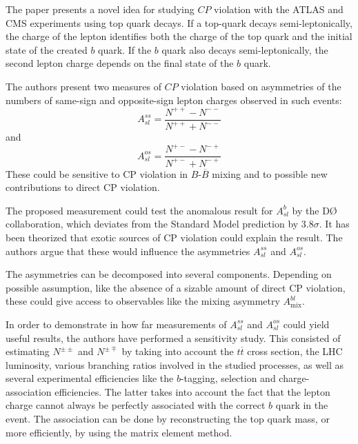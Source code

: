 

\noindent
The paper\cite{paper} presents a novel idea for studying $C\!P$ violation with the ATLAS and CMS experiments using top quark decays.
If a top-quark decays semi-leptonically, the charge of the lepton identifies both the charge of the top quark and the initial state of the created $b$ quark.
If the $b$ quark also decays semi-leptonically, the second lepton charge depends on the final state of the $b$ quark.

The authors present two measures of $C\!P$ violation based on asymmetries of the numbers of same-sign and opposite-sign lepton charges observed in such events:
\begin{equation}
  A^{ss}_{sl} = \frac{N^{++} - N^{--}}{N^{++} + N^{--}}
\end{equation}
and
\begin{equation}
  A^{os}_{sl} = \frac{N^{+-} - N^{-+}}{N^{+-} + N^{-+}}
\end{equation}
These could be sensitive to CP violation in $B$-$\overline{B}$ mixing and to possible new contributions to direct CP violation.

The proposed measurement could test the anomalous result for $A^b_{sl}$ by the DØ collaboration, which deviates from the Standard Model prediction by $3.8σ$.
It has been theorized that exotic sources of CP violation could explain the result.
The authors argue that these would influence the asymmetries $A^{ss}_{sl}$ and $A^{os}_{sl}$.

The asymmetries can be decomposed into several components.
Depending on possible assumption, like the absence of a sizable amount of direct CP violation, these could give access to observables like the mixing asymmetry $A^{bl}_\text{mix}$.

In order to demonstrate in how far measurements of $A^{ss}_{sl}$ and $A^{os}_{sl}$ could yield useful results, the authors have performed a sensitivity study.
This consisted of estimating $N^{\pm\pm}$ and $N^{\pm\mp}$ by taking into account the $t\overline{t}$ cross section, the LHC luminosity, various branching ratios involved in the studied processes, as well as several experimental efficiencies like the $b$-tagging, selection and charge-association efficiencies.
The latter takes into account the fact that the lepton charge cannot always be perfectly associated with the correct $b$ quark in the event.
The association can be done by reconstructing the top quark mass, or more efficiently, by using the matrix element method.

